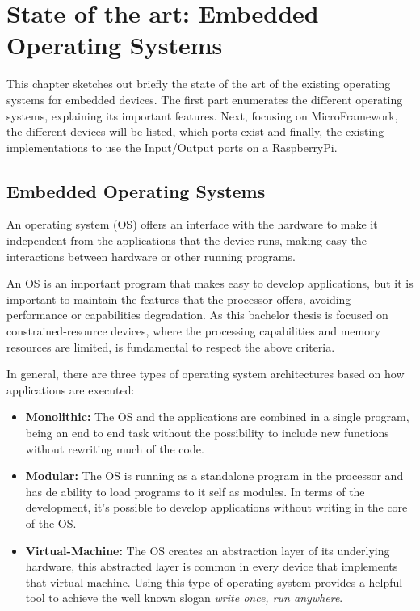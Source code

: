 \chapter{State of the art: Embedded Operating Systems}\label{C:State-Art-Microframework}

This chapter sketches out briefly the state of the art of the existing operating systems for embedded devices. The first part enumerates the different operating systems, explaining its important features. Next, focusing on MicroFramework, the different devices will be listed, which ports exist and finally, the existing implementations to use the Input/Output ports on a RaspberryPi.

\section{Embedded Operating Systems}\label{S:Embedded-OS}

An operating system (OS) offers an interface with the hardware to make it independent from the applications that the device runs, making easy the interactions between hardware or other running programs.

An OS is an important program that makes easy to develop applications, but it is important to maintain the features that the processor offers, avoiding performance or capabilities degradation. As this bachelor thesis is focused on constrained-resource devices, where the processing capabilities and memory resources are limited, is fundamental to respect the above criteria.

In general, there are three types of operating system architectures based on how applications are executed:

\begin{itemize}
\item \textbf{Monolithic:} The OS and the applications are combined in a single program, being an end to end task without the possibility to include new functions without rewriting much of the code.

\item \textbf{Modular:} The OS is running as a standalone program in the processor and has de ability to load programs to it self as modules. In terms of the development, it's possible to develop applications without writing in the core of the OS.

\item \textbf{Virtual-Machine:} The OS creates an abstraction layer of its underlying hardware, this abstracted layer is common in every device that implements that virtual-machine. Using this type of operating system provides a helpful tool to achieve the well known slogan \textit{write once, run anywhere}. 
\end{itemize}


